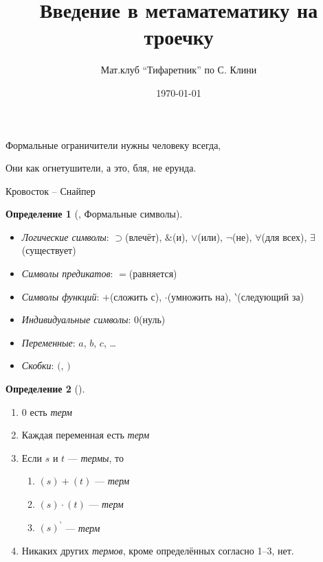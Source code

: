 \documentclass[a4paper, 12pt]{article}  %
\author{Мат.клуб ``Тифаретник'' по С. Клини}
\title{Введение в метаматематику на троечку}
\date{\today}
\DeclareMathOperator{\conj}{\mathbb{\&}}
\theoremstyle{definition}
\newtheorem*{definition}{Определение}
\begin{document}
	\maketitle
	
	\epigraph{
		Формальные ограничители нужны человеку всегда,
			
		Они как огнетушители, а это, бля, не ерунда.
	}{Кровосток -- Снайпер}

	

	\begin{definition}[,  Формальные символы]
		\leavevmode	
		\begin{itemize}
			\setlength\itemsep{-3pt}
			\item \textit{Логические символы}: 
				$\supset$(влечёт), $\conj$(и), $\vee$(или),
				$\neg$(не), $\forall$(для всех), $\exists$(существует)
			\item \textit{Символы предикатов}: $=$(равняется)
			\item \textit{Символы функций}: 
				$+$(сложить с), $\cdot$(умножить на), $\backprime$(следующий за)
			\item \textit{Индивидуальные символы}: $0$(нуль)
			\item \textit{Переменные}: $a$, $b$, $c$, \dots
			\item \textit{Скобки}: $($, $)$
		\end{itemize}
	\end{definition}
	
	\begin{definition}[]
		\leavevmode			
		\begin{enumerate}
			\setlength\itemsep{-3pt}	
			\item $0$ есть \textit{терм}
			\item Каждая переменная есть \textit{терм}
			\item Если $s$ и $t$ --- \textit{термы}, то
			\begin{multicols}{4}
				\begin{enumerate}
				\item $(s)+(t)$          --- \textit{терм}
				\item $(s) \cdot (t)$    --- \textit{терм}
				\item $(s)^{\backprime}$ --- \textit{терм}
				\end{enumerate}
			\end{multicols}
			\item Никаких других \textit{термов}, кроме определённых согласно 1--3, нет.
		\end{enumerate}
	\end{definition}
\end{document}
